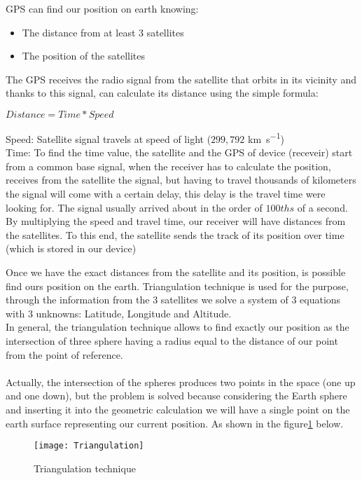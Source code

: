 \documentclass[tesi]{subfiles}
\begin{document}
GPS can find our position on earth knowing:
\begin{itemize}
\item The distance from at least 3 satellites
\item The position of the satellites
\end{itemize}

The GPS receives the radio signal from the satellite that orbits in its vicinity and thanks to this signal, can calculate its distance using the simple formula:
\begin{center} $Distance = Time * Speed$ \end{center}

\noindent Speed: Satellite signal travels at speed of light ($299,792$ \si{\km\per\second})\\
Time: To find the time value, the satellite and the GPS of device (receveir) start from a common base signal, when the receiver has to calculate the position, receives from the satellite the signal, but having to travel thousands of kilometers the signal will come with a certain delay, this delay is the travel time were looking for. The signal usually arrived about in the order of $100ths$ of a second.
By multiplying the speed and travel time, our receiver will have distances from the satellites. To this end, the satellite sends the track of its position over time (which is stored in our device)

Once we have the exact distances from the satellite and its position, is possible find ours position on the earth. Triangulation technique is used for the purpose, through the information from the 3 satellites we solve a system of 3 equations with 3 unknowns: Latitude, Longitude and Altitude.\\
In general, the triangulation technique allows to find exactly our position as the intersection of three sphere having a radius equal to the distance of our point from the point of reference.\\\\
Actually, the intersection of the spheres produces two points in the space (one up and one down), but the problem is solved because considering the Earth sphere and inserting it into the geometric calculation we will have a single point on the earth surface representing our current position. As shown in the figure\ref{fig:Triangulation technique} below.
\vspace{1cm}
\begin{figure}[h]
\centering
\texttt{[image: Triangulation]}
\caption{Triangulation technique}
\label{fig:Triangulation technique}
\end{figure}
\vspace{0.5cm}
\end{document}
